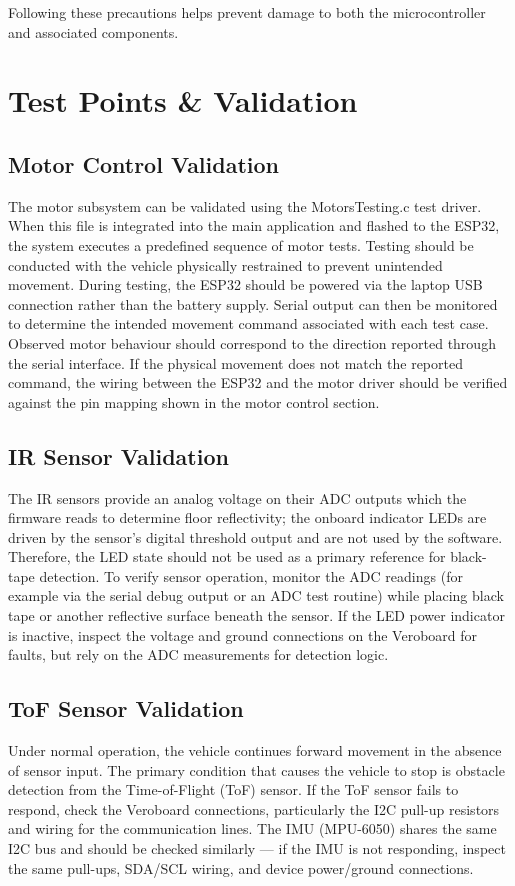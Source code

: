 Following these precautions helps prevent damage to both the microcontroller and associated components.

\section{Test Points \& Validation}

\subsection{Motor Control Validation}
The motor subsystem can be validated using the MotorsTesting.c test driver. When this file is integrated into the main application and flashed to the ESP32, the system executes a predefined sequence of motor tests. 
Testing should be conducted with the vehicle physically restrained to prevent unintended movement. During testing, the ESP32 should be powered via the laptop USB connection rather than the battery supply. Serial output can then be monitored to determine the intended movement command associated with each test case. 
Observed motor behaviour should correspond to the direction reported through the serial interface. If the physical movement does not match the reported command, the wiring between the ESP32 and the motor driver should be verified against the pin mapping shown in the motor control section.

\subsection{IR Sensor Validation}
The IR sensors provide an analog voltage on their ADC outputs which the firmware reads to determine floor reflectivity; the onboard indicator LEDs are driven by the sensor's digital threshold output and are not used by the software. Therefore, the LED state should not be used as a primary reference for black-tape detection.
To verify sensor operation, monitor the ADC readings (for example via the serial debug output or an ADC test routine) while placing black tape or another reflective surface beneath the sensor. If the LED power indicator is inactive, inspect the voltage and ground connections on the Veroboard for faults, but rely on the ADC measurements for detection logic.

\subsection{ToF Sensor Validation}
Under normal operation, the vehicle continues forward movement in the absence of sensor input. The primary condition that causes the vehicle to stop is obstacle detection from the Time-of-Flight (ToF) sensor.
If the ToF sensor fails to respond, check the Veroboard connections, particularly the I2C pull-up resistors and wiring for the communication lines. The IMU (MPU-6050) shares the same I2C bus and should be checked similarly — if the IMU is not responding, inspect the same pull-ups, SDA/SCL wiring, and device power/ground connections.

